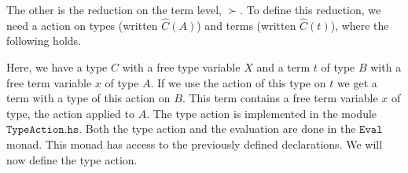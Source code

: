 \documentclass[a4paper,cleardoubleempty,BCOR1cm]{scrbook}
\begin{document}
The other is the reduction on the term level, $\mathtt{\succ}$. To define this
reduction, we need a action on types (written \(\widehat{C}(A)\)) and terms
(written \(\widehat{C}(t)\)), where the following holds.
\begin{prooftree}
\end{prooftree}
Here, we have a type \(C\) with a free type variable \(X\) and a term \(t\) of type
\(B\) with a free term variable \(x\) of type \(A\). If we use the action of this
type on \(t\) we get a term with a type of this action on \(B\). This term
contains a free term variable \(x\) of type, the action applied to \(A\). The
type action is implemented in the module $\mathtt{TypeAction.hs}$. Both the type
action and the evaluation are done in the $\mathtt{Eval}$\;monad. This monad has access
to the previously defined declarations. We will now define the type action.
\end{document}
